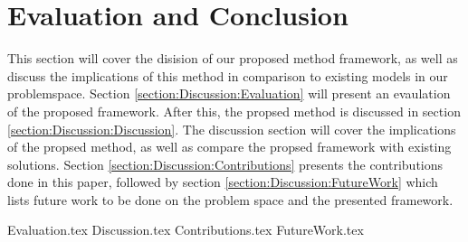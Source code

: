 \chapter{Evaluation and Conclusion}

\label{section:Discussion}

This section will cover the disision of our proposed method framework, as well as discuss the implications of this method in comparison to existing models in our problemspace.
Section \ref{section:Discussion:Evaluation} will present an evaulation of the proposed framework.
After this, the propsed method is discussed in section \ref{section:Discussion:Discussion}.
The discussion section will cover the implications of the propsed method, as well as compare the propsed framework with existing solutions.
Section \ref{section:Discussion:Contributions} presents the contributions done in this paper,
followed by section \ref{section:Discussion:FutureWork} which lists future work to be done on the problem space and the presented framework.

{Evaluation.tex}
{Discussion.tex}
{Contributions.tex}
{FutureWork.tex}

